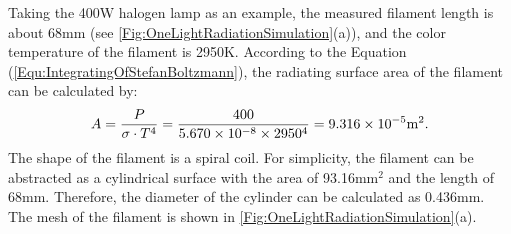 


Taking the 400W halogen lamp as an example, the measured filament length is about 68mm (see \ref{Fig:OneLightRadiationSimulation}(a)), and the color temperature of the filament is 2950K. According to the Equation (\ref{Equ:IntegratingOfStefanBoltzmann}), the radiating surface area of the filament can be calculated by:
\begin{equation}
A = \frac{P}{\sigma \cdot T^4} = \frac{400}{5.670\times10^{-8}\times2950^4}=9.316\times10^{-5} {\rm{m }}^2.
\end{equation}
The shape of the filament is a spiral coil. 
For simplicity, the filament can be abstracted as a cylindrical surface with the area of 93.16mm$^2$ and the length of 68mm. Therefore, the diameter of the cylinder can be calculated as 0.436mm. The mesh of the filament is shown in \ref{Fig:OneLightRadiationSimulation}(a).

